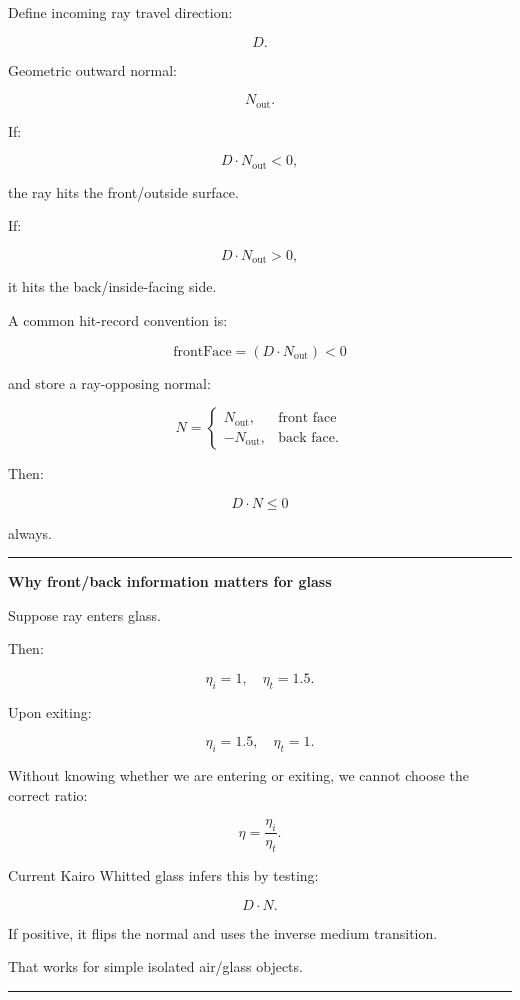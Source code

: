 Define incoming ray travel direction:

\[
D.
\]

Geometric outward normal:

\[
N_{\text{out}}.
\]

If:

\[
D\cdot N_{\text{out}}<0,
\]

the ray hits the front/outside surface.

If:

\[
D\cdot N_{\text{out}}>0,
\]

it hits the back/inside-facing side.

A common hit-record convention is:

\[
\boxed{
\text{frontFace}
=
(D\cdot N_{\text{out}})<0
}
\]

and store a ray-opposing normal:

\[
N=
\begin{cases}
N_{\text{out}}, & \text{front face}\\
-N_{\text{out}}, & \text{back face}.
\end{cases}
\]

Then:

\[
D\cdot N\le0
\]

always.

\begin{center}\rule{0.5\linewidth}{0.5pt}\end{center}

\textbf{Why front/back information matters for glass}

Suppose ray enters glass.

Then:

\[
\eta_i=1,
\quad
\eta_t=1.5.
\]

Upon exiting:

\[
\eta_i=1.5,
\quad
\eta_t=1.
\]

Without knowing whether we are entering or exiting, we cannot choose the correct ratio:

\[
\eta=
\frac{\eta_i}{\eta_t}.
\]

Current Kairo Whitted glass infers this by testing:

\[
D\cdot N.
\]

If positive, it flips the normal and uses the inverse medium transition.

That works for simple isolated air/glass objects.

\begin{center}\rule{0.5\linewidth}{0.5pt}\end{center}

